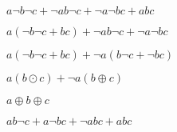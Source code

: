 
$a \neg b \neg c + \neg a b \neg c + \neg a \neg b c + a b c$

$a (\neg b\neg c+bc) + \neg a b \neg c + \neg a \neg b c$

$a (\neg b\neg c+bc) + \neg a (b \neg c + \neg b c)$

$a (b \odot c) + \neg a (b \oplus c)$


$a \oplus b \oplus c$



$ a b \neg c + a \neg b c + \neg a b c + a b c $
